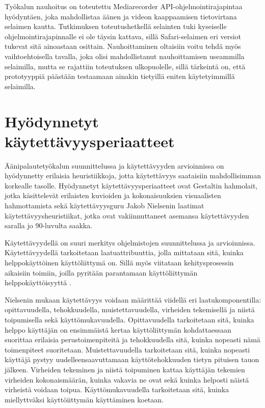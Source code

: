\documentclass[utf8]{gradu3}
\begin{document}
Työkalun nauhoitus on toteutettu Mediarecorder API-ohjelmointirajapintaa hyödyntäen, joka mahdollistaa äänen ja videon kaappaamisen tietovirtana selaimen kautta. Tutkimuksen toteutushetkellä selainten tuki kyseiselle ohjelmointirajapinnalle ei ole täysin kattava, sillä Safari-selaimen eri versiot tukevat sitä ainoastaan osittain. Nauhoittaminen oltaisiin voitu tehdä myös vaihtoehtoisella tavalla, joka olisi mahdollistanut nauhoittamisen useammilla selaimilla, mutta se rajattiin toteutuksen ulkopuolelle, sillä tärkeintä on, että prototyyppiä päästään testaamaan ainakin tietyillä eniten käytetyimmillä selaimilla.

\section{Hyödynnetyt käytettävyysperiaatteet}

Äänipalautetyökalun suunnittelussa ja käytettävyyden arvioinnissa on hyödynnetty erilaisia heuristiikkoja, jotta käytettävyys saataisiin mahdollisimman korkealle tasolle. Hyödynnetyt käytettävyysperiaatteet ovat Gestaltin hahmolait, jotka käsittelevät erilaisten kuvioiden ja kokonaisuuksien visuaalisten hahmottamista sekä käytettävyysguru Jakob Nielsenin laatimat käytettävyysheuristiikat, jotka ovat vakiinnuttaneet asemansa käytettävyyden saralla jo 90-luvulta saakka.

Käytettävyydellä on suuri merkitys ohjelmistojen suunnittelussa ja arvioinnissa. Käytettävyydellä tarkoitetaan laatuattribuuttia, jolla mittataan sitä, kuinka helppokäyttöinen käyttöliittymä on. Sillä myös viitataan kehitysprosessin aikaisiin toimiin, joilla pyritään parantamaan käyttöliittymän helppokäyttöisyyttä \parencite[][]{intro-usability}.

Nielsenin \parencite[][]{intro-usability} mukaan käytettävyys voidaan määrittää viidellä eri laatukomponentilla: opittavuudella, tehokkuudella, muistettavuudella, virheiden tekemisellä ja niistä toipumisella sekä käyttömukavuudella. Opittavuudella tarkoitetaan sitä, kuinka helppo käyttäjän on ensimmäistä kertaa käyttöliittymän kohdattaessaan suorittaa erilaisia perustoimenpiteitä ja tehokkuudella sitä, kuinka nopeasti nämä toimenpiteet suoritetaan. Muistettavuudella tarkoitetaan sitä, kuinka nopeasti käyttäjä pystyy uudelleensaavuttamaan käyttötehokkuuden tietyn pituisen tauon jälkeen. Virheiden tekeminen ja niistä toipuminen kattaa käyttäjän tekemien virheiden kokonaismäärän, kuinka vakavia ne ovat sekä kuinka helposti näistä virheistä voidaan toipua. Käyttömukavuudella tarkoitetaan sitä, kuinka miellyttväksi käyttöiittymän käyttäminen koetaan.
\end{document}
